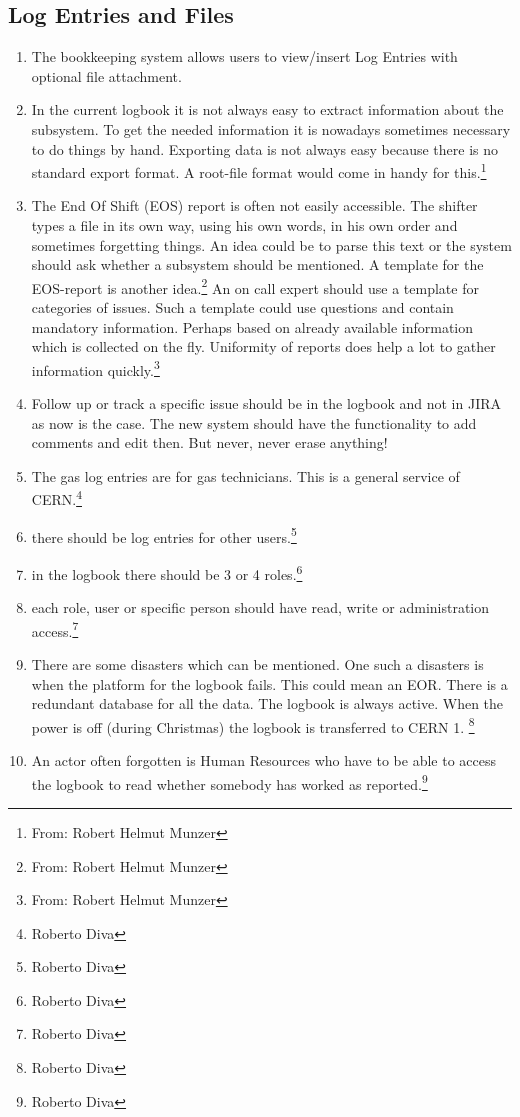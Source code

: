 \subsection{Log Entries and Files}
\begin{enumerate}
  \item The bookkeeping system allows users to view/insert Log Entries with optional file attachment.
  \item In the current logbook it is not always easy to extract information about the subsystem. To get the needed information it is nowadays sometimes necessary to do things by hand. Exporting data is not always easy because there is no standard export format. A root-file format would come in handy for this.\footnote{From: Robert Helmut Munzer}
  \item The End Of Shift (EOS) report is often not easily accessible. The shifter types a file in its own way, using his own words, in his own order and sometimes forgetting things. An idea could be to parse this text or the system should ask whether a subsystem should be mentioned. A template for the EOS-report is another idea.\footnote{From: Robert Helmut Munzer}
  An on call expert should use a template for categories of issues. Such a template could use questions and contain mandatory information. Perhaps based on already available information which is collected on the fly. Uniformity of reports does help a lot to gather information quickly.\footnote{From: Robert Helmut Munzer}
  \item Follow up or track a specific issue should be in the logbook and not in JIRA as now is the case. The new system should have the functionality to add comments and edit then. But never, never erase anything! 
  \item The gas log entries are for gas technicians. This is a general service of CERN.\footnote{Roberto Diva}
    \item there should be log entries for other users.\footnote{Roberto Diva}
  \item in the logbook there should be 3 or 4 roles.\footnote{Roberto Diva}
  \item each role, user or specific person should have read, write or administration access.\footnote{Roberto Diva}
  \item There are some disasters which can be mentioned. One such a disasters is when the platform for the logbook fails. This could mean an EOR. There is a redundant database for all the data. The logbook is always active. When the power is off (during Christmas) the logbook is transferred to CERN 1. \footnote{Roberto Diva}
  \item An actor often forgotten is Human Resources who have to be able to access the logbook to read whether somebody has worked as reported.\footnote{Roberto Diva}


\end{enumerate}
